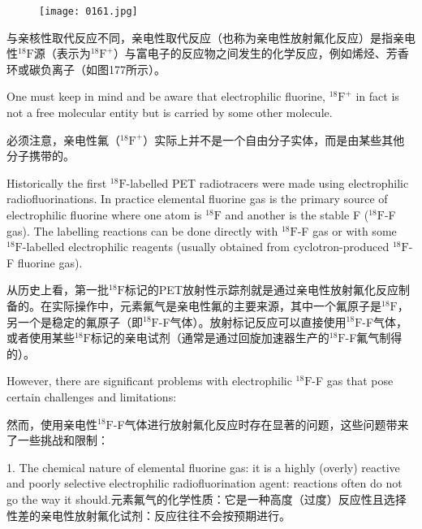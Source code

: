 \documentclass[dvipsnames, svgnames,a4paper,11pt]{article}
\begin{document}
\begin{figure}[h]
	\centering
    \texttt{[image: 0161.jpg]}    
     \label{fig177}
\end{figure}

与亲核性取代反应不同，亲电性取代反应（也称为亲电性放射氟化反应）是指亲电性${}^\mathrm{18}\mathrm{F}$源（表示为{${}^\mathrm{18}\mathrm{F}^+$}）与富电子的反应物之间发生的化学反应，例如烯烃、芳香环或碳负离子（如图177所示）。

One must keep in mind and be aware that electrophilic fluorine, {${}^\mathrm{18}\mathrm{F}^+$} in fact is not a
free molecular entity but is carried by some other molecule.

必须注意，亲电性氟（{${}^\mathrm{18}\mathrm{F}^+$}）实际上并不是一个自由分子实体，而是由某些其他分子携带的。


Historically the first ${}^\mathrm{18}\mathrm{F}$-labelled PET radiotracers were made using electrophilic
radiofluorinations. In practice elemental fluorine gas is the primary source of
electrophilic fluorine where one atom is ${}^\mathrm{18}\mathrm{F}$ and another is the stable F (${}^\mathrm{18}\mathrm{F}$-F gas).
The labelling reactions can be done directly with ${}^\mathrm{18}\mathrm{F}$-F gas or with some ${}^\mathrm{18}\mathrm{F}$-labelled
electrophilic reagents (usually obtained from cyclotron-produced ${}^\mathrm{18}\mathrm{F}$-F fluorine gas).

从历史上看，第一批${}^\mathrm{18}\mathrm{F}$标记的PET放射性示踪剂就是通过亲电性放射氟化反应制备的。在实际操作中，元素氟气是亲电性氟的主要来源，其中一个氟原子是${}^\mathrm{18}\mathrm{F}$，另一个是稳定的氟原子（即${}^\mathrm{18}\mathrm{F}$-F气体）。放射标记反应可以直接使用${}^\mathrm{18}\mathrm{F}$-F气体，或者使用某些${}^\mathrm{18}\mathrm{F}$标记的亲电试剂（通常是通过回旋加速器生产的${}^\mathrm{18}\mathrm{F}$-F氟气制得的）。

However, there are significant problems with electrophilic ${}^\mathrm{18}\mathrm{F}$-F gas that pose certain
challenges and limitations:

然而，使用亲电性${}^\mathrm{18}\mathrm{F}$-F气体进行放射氟化反应时存在显著的问题，这些问题带来了一些挑战和限制：



1. The chemical nature of elemental fluorine gas: it is a highly (overly) reactive
and poorly selective electrophilic radiofluorination agent: reactions often do
not go the way it should.元素氟气的化学性质：它是一种高度（过度）反应性且选择性差的亲电性放射氟化试剂：反应往往不会按预期进行。
\end{document}
